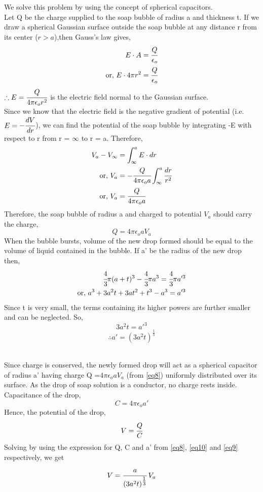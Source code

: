 We solve this problem by using the concept of spherical capacitors.\\
Let Q be the charge supplied to the soap bubble of radius a and thickness t. If we draw a spherical Gaussian surface outside the soap bubble at any distance r from its center ($r > a$),then Gauss's law gives,
\begin{align*}
E \cdot A &= \cfrac{Q}{\epsilon_o}\\
\text{or, }E \cdot 4\pi r^2 &= \cfrac{Q}{\epsilon_o}
\end{align*}
$\therefore E = \cfrac{Q}{4\pi \epsilon_o r^2}$ is the electric field normal to the Gaussian surface.\\
Since we know that the electric field is the negative gradient of potential \bigg(i.e. $E = - \cfrac{dV}{dr}$\bigg), we can find the potential of the soap bubble by integrating -E with respect to r from r = $\infty$ to r = a.
Therefore, 
\begin{align*}
 V_a - V_{\infty} &= \int_{\infty}^a E\cdot dr\\
\text{or, }  V_a &= - \cfrac{Q}{4\pi \epsilon_o a} \int_{\infty}^a \cfrac{dr}{r^2}\\
\text{or, } V_a &= \cfrac{Q}{4\pi\epsilon_o a}
\end{align*}
Therefore, the soap bubble of radius a and charged to potential $V_a$ should carry the charge, 
\begin{equation}\label{eq8}
    Q = 4\pi \epsilon_o a V_a
\end{equation}
When the bubble bursts, volume of the new drop formed should be equal to the volume of liquid contained in the bubble. If a' be the radius of the new drop then,
\begin{align*}
 \cfrac{4}{3} \pi (a + t)^3 - \cfrac{4}{3} \pi a^3 = \cfrac{4}{3} \pi a'^{3}\\
\text{or, } a^3 + 3a^2t + 3at^2 + t^3 - a^3 = a'^{3}
\end{align*}
Since t is very small, the terms containing its higher powers are further smaller and can be neglected. So, 
\[ 3a^2t = a'^{3}\]
\begin{equation}\label{eq9}
    \therefore a' = (3a^2t)^{\tfrac{1}{3}}
\end{equation}  

\bigg[Or, we could have simply done 4$\pi a^2 t = \cfrac{4}{3} \pi a'^{3}$, with the logic that volume is surface area (4$\pi a^2)$ times thickness (t)\bigg]\\

Since charge is conserved, the newly formed drop will act as a spherical capacitor of radius a' having charge Q =$ 4\pi \epsilon_o a V_a$ (from \ref{eq8}) uniformly distributed over its surface. As the drop of soap solution is a conductor, no charge rests inside. \\
Capacitance of the drop, \begin{equation}\label{eq10}
    C = 4 \pi \epsilon_o a'
\end{equation}
Hence, the potential of the drop, \[ V = \cfrac{Q}{C}\]
Solving by using the expression for Q, C and a' from \ref{eq8}, \ref{eq10} and \ref{eq9} respectively, we get \[ V = \cfrac{a}{(3a^2t)^{\tfrac{1}{3}}} \hspace{2pt}V_a \]

